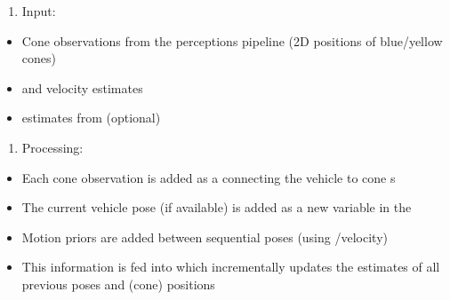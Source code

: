 \documentclass[letterpaper,10pt,english]{sphinxmanual}
\begin{document}
\sphinxAtStartPar
{}
\begin{enumerate}
%
\item {} 
\sphinxAtStartPar
Input:

\end{enumerate}
\begin{itemize}
\item {} 
\sphinxAtStartPar
Cone observations from the perceptions pipeline (2D positions of blue/yellow cones)

\item {} 
\sphinxAtStartPar
{\hyperref[\detokenize{glossary:term-IMU}]{}} and velocity estimates

\item {} 
\sphinxAtStartPar
{\hyperref[\detokenize{glossary:term-Pose}]{}} estimates from {\hyperref[\detokenize{glossary:term-GPS}]{}} (optional)

\end{itemize}
\begin{enumerate}
%
\setcounter{enumi}{1}
\item {} 
\sphinxAtStartPar
Processing:

\end{enumerate}
\begin{itemize}
\item {} 
\sphinxAtStartPar
Each cone observation is added as a {\hyperref[\detokenize{glossary:term-Bearing-range-factor}]{}} connecting the vehicle {\hyperref[\detokenize{glossary:term-Pose}]{}} to cone {\hyperref[\detokenize{glossary:term-Landmark}]{}}s

\item {} 
\sphinxAtStartPar
The current vehicle pose (if available) is added as a new variable in the {\hyperref[\detokenize{glossary:term-Factor-Graph}]{}}

\item {} 
\sphinxAtStartPar
Motion priors are added between sequential poses (using {\hyperref[\detokenize{glossary:term-IMU}]{}}/velocity)

\item {} 
\sphinxAtStartPar
This information is fed into {\hyperref[\detokenize{glossary:term-iSAM2}]{}} which incrementally updates the estimates of all previous poses and {\hyperref[\detokenize{glossary:term-Landmark}]{}} (cone) positions

\end{itemize}
\end{document}
